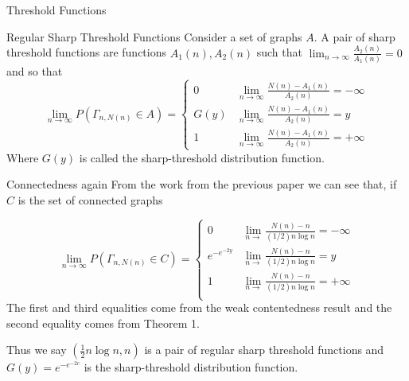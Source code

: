 \documentclass{beamer}
\begin{document}
\begin{frame}{Threshold Functions}
	\begin{block}{Regular Sharp Threshold Functions}
		Consider a set of graphs $A$. A pair of sharp threshold functions are functions $A_1(n),A_2(n)$ such that $\lim_{n\rightarrow \infty}\frac{A_2(n)}{A_1(n)}=0$ and so that
		\begin{equation}
			\lim_{n\rightarrow \infty}P(\Gamma_{n,N(n)}\in A)=\begin{cases}
				0 & \lim_{n\rightarrow \infty}\frac{N(n)-A_1(n)}{A_2(n)}=-\infty \\
				G(y)&\lim_{n\rightarrow\infty}\frac{N(n)-A_1(n)}{A_2(n)}=y\\
				1 & \lim_{n\rightarrow \infty}\frac{N(n)-A_1(n)}{A_2(n)}=+\infty 
			\end{cases}
		\end{equation}
		Where $G(y)$ is called the sharp-threshold distribution function. 
	\end{block}
\end{frame}

\begin{frame}{Connectedness again}
	From the work from the previous paper we can see that, if $C$ is the set of connected graphs
	
	\begin{equation}
		\lim_{n\rightarrow \infty}P(\Gamma_{n,N(n)}\in C)=\begin{cases}
			0&\lim_{n\rightarrow}\frac{ N(n)-n}{(1/2)n\log n} = -\infty \\
			e^{-e^{-2y}}&\lim_{n\rightarrow}\frac{ N(n)-n}{(1/2)n\log n} = y\\
			1 &\lim_{n\rightarrow}\frac{ N(n)-n}{(1/2) n\log n} = +\infty \\
		\end{cases}
	\end{equation}
	The first and third equalities come from the weak contentedness result and the second equality comes from Theorem 1.  
	
	Thus we say $(\frac{1}{2}n\log n, n)$ is a pair of regular sharp threshold functions and $G(y)=e^{-e^{-2c}}$ is the sharp-threshold distribution function. 
\end{frame}
\end{document}
